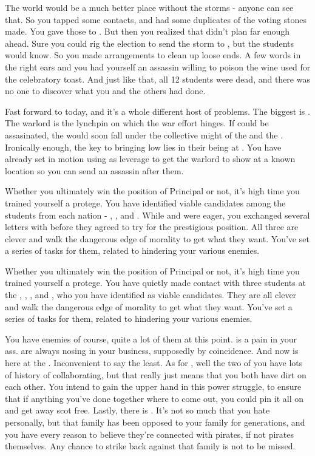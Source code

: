\documentclass[char]{GL2020}
\begin{document}
The world would be a much better place without the storms - anyone can see that. So you tapped some contacts, and had some duplicates of the voting stones made. You gave those to \cHeadScientist{}. But then you realized that \cDiplomat{} didn’t plan far enough ahead. Sure you could rig the election to send the storm to \pShip{}, but the students would know. So you made arrangements to clean up loose ends. A few words in the right ears and you had yourself an assassin willing to poison the wine used for the celebratory toast. And just like that, all 12 students were dead, and there was no one to discover what you and the others had done.

Fast forward to today, and it's a whole different host of problems. The biggest is \cLoud{\full}. The warlord is the lynchpin on which the \pShip{} war effort hinges. If \cLoud{\they} could be assasinated, the \pShip{} would soon fall under the collective might of the \pFarm{} and the \pTech{}. Ironically enough, the key to bringing \cLoud{} low lies in their \cWarlordDaughter{\child} being at \pSchool{}. You have already set in motion using \cWarlordDaughter{\them} as leverage to get the warlord to show \cLoud{\themself} at a known location so you can send an assassin after them.

Whether you ultimately win the position of Principal or not, it’s high time you trained yourself a protege. You have identified viable candidates among the students from each nation - \cPirateChild{}, \cLibAssist{}, and \cAmbition{}.  While \cLibAssist{} and \cAmbition{} were eager, you exchanged several letters with \cPirateChild{} before they agreed to try for the prestigious position.  All three are clever and walk the dangerous edge of morality to get what they want. You’ve set a series of tasks for them, related to hindering your various enemies.

Whether you ultimately win the position of Principal or not, it’s high time you trained yourself a protege. You have quietly made contact with three students at the \pSc{}, \cPirateChild{}, \cLibAssist{}, and \cAmbition{}, who you have identified as viable candidates. They are all clever and walk the dangerous edge of morality to get what they want. You’ve set a series of tasks for them, related to hindering your various enemies.

You have enemies of course, quite a lot of them at this point. \cInterpol{} is a pain in your ass. \cInterpol{\They} are always nosing in your business, supposedly by coincidence. And now \cInterpol{} is here at the \pSc{}. Inconvenient to say the least. As for \cDiplomat{}, well the two of you have lots of history of collaborating, but that really just means that you both have dirt on each other. You intend to gain the upper hand in this power struggle, to ensure that if anything you’ve done together where to come out, you could pin it all on \cDiplomat{} and get away scot free. Lastly, there is \cJuniorStatesman{}. It’s not so much that you hate \cJuniorStatesman{} personally, but that \cJuniorStatesman{\their} family has been opposed to your family for generations, and you have every reason to believe they’re connected with pirates, if not pirates themselves. Any chance to strike back against that family is not to be missed.
\end{document}
